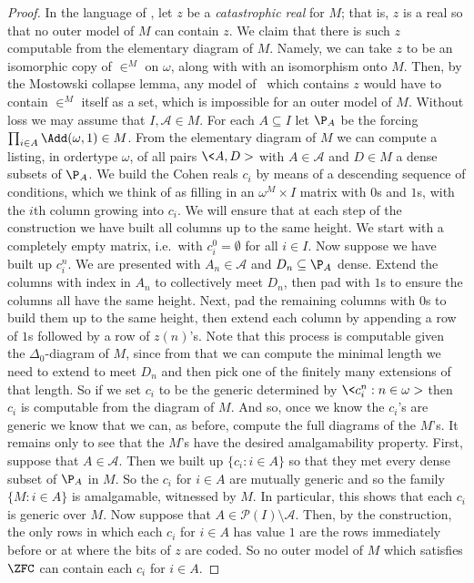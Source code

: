 \documentclass{amsart}
\begin{document}
\begin{proof}
In the language of \cite{HHKVW2019}, let $z$ be a \emph{catastrophic real} for $M$; that is, $z$ is a real so that no outer model of $M$ can contain $z$. We claim that there is such $z$ computable from the elementary diagram of $M$. Namely, we can take $z$ to be an isomorphic copy of $\in^M$ on $\omega$, along with with an isomorphism onto $M$. Then, by the Mostowski collapse lemma, any model of \ZF\ which contains $z$ would have to contain $\in^M$ itself as a set, which is impossible for an outer model of $M$.
Without loss we may assume that $I,\mathcal A \in M$. For each $A \subseteq I$ let $\P_A$ be the forcing $\prod_{i \in A} \Add(\omega,1) \in M$.
From the elementary diagram of $M$ we can compute a listing, in ordertype $\omega$, of all pairs $\<A,D>$ with $A \in \mathcal A$ and $D \in M$ a dense subsets of $\P_A$. We build the Cohen reals $c_i$ by means of a descending sequence of conditions, which we think of as filling in an $\omega^M \times I$ matrix with $0$s and $1$s, with the $i$th column growing into $c_i$. We will ensure that at each step of the construction we have built all columns up to the same height.
We start with a completely empty matrix, i.e.\ with $c^0_i = \emptyset$ for all $i \in I$. Now suppose we have built up $c^n_i$. We are presented with $A_n \in \mathcal A$ and $D_n \subseteq \P_A$ dense. Extend the columns with index in $A_n$ to collectively meet $D_n$, then pad with $1$s to ensure the columns all have the same height. Next, pad the remaining columns with $0$s to build them up to the same height, then extend each column by appending a row of $1$s followed by a row of $z(n)$'s. Note that this process is computable given the $\Delta_0$-diagram of $M$, since from that we can compute the minimal length we need to extend to meet $D_n$ and then pick one of the finitely many extensions of that length. So if we set $c_i$ to be the generic determined by $\<c^n_i : n \in \omega>$ then $c_i$ is computable from the diagram of $M$. And so, once we know the $c_i$'s are generic we know that we can, as before, compute the full diagrams of the $M$'s.
It remains only to see that the $M$'s have the desired amalgamability property. First, suppose that $A \in \mathcal A$. Then we built up $\{ c_i : i \in A \}$ so that they met every dense subset of $\P_A$ in $M$. So the $c_i$ for $i \in A$ are mutually generic and so the family $\{ M : i \in A \}$ is amalgamable, witnessed by $M$. In particular, this shows that each $c_i$ is generic over $M$. Now suppose that $A \in \mathcal P(I) \setminus \mathcal A$. Then, by the construction, the only rows in which each $c_i$ for $i \in A$ has value $1$ are the rows immediately before or at where the bits of $z$ are coded. So no outer model of $M$ which satisfies $\ZFC$ can contain each $c_i$ for $i \in A$.
\end{proof}
\end{document}
